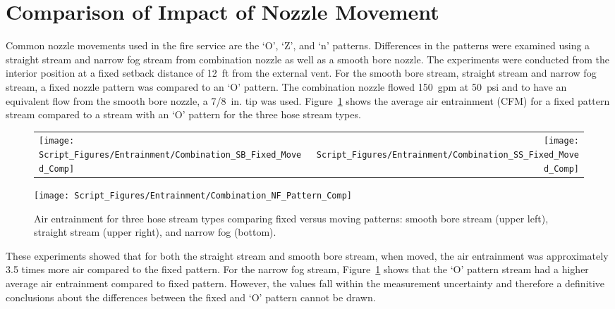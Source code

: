 \documentclass[12pt,oneside]{book}
\begin{document}
\clearpage

\section{Comparison of Impact of Nozzle Movement}
\label{sec:movement}

Common nozzle movements used in the fire service are the `O', `Z', and `n' patterns. Differences in the patterns were examined using a straight stream and narrow fog stream from combination nozzle as well as a smooth bore nozzle. The experiments were conducted from the interior position at a fixed setback distance of 12~ft from the external vent. For the smooth bore stream, straight stream and narrow fog stream, a fixed nozzle pattern was compared to an `O' pattern. The combination nozzle flowed 150~gpm at 50~psi and to have an equivalent flow from the smooth bore nozzle, a 7/8~in. tip was used. Figure~\ref{fig:SB_SS_NF_Movement_Comparison} shows the average air entrainment (CFM) for a fixed pattern stream compared to a stream with an `O' pattern for the three hose stream types.

\begin{figure}[!ht]
\begin{tabular*}{\textwidth}{lr}
\texttt{[image: Script\_Figures/Entrainment/Combination\_SB\_Fixed\_Moved\_Comp]} &
\texttt{[image: Script\_Figures/Entrainment/Combination\_SS\_Fixed\_Moved\_Comp]} \\
\end{tabular*}
\centering
\texttt{[image: Script\_Figures/Entrainment/Combination\_NF\_Pattern\_Comp]} \\
\caption[Air Entrainment Comparison of Fixed Versus Moving Patterns]{Air entrainment for three hose stream types comparing fixed versus moving patterns: smooth bore stream (upper left), straight stream (upper right), and narrow fog (bottom).}
\label{fig:SB_SS_NF_Movement_Comparison}
\end{figure}

These experiments showed that for both the straight stream and smooth bore stream, when moved, the air entrainment was approximately 3.5 times more air compared to the fixed pattern. For the narrow fog stream, Figure~\ref{fig:SB_SS_NF_Movement_Comparison} shows that the `O' pattern stream had a higher average air entrainment compared to fixed pattern. However, the values fall within the measurement uncertainty and therefore a definitive conclusions about the differences between the fixed and `O' pattern cannot be drawn. 
\end{document}
